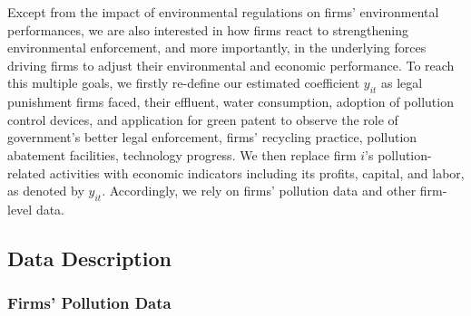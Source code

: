 \documentclass[12pt,english]{article}
\begin{document}
Except from the impact of environmental regulations on firms' environmental performances, we are also interested in how firms react to strengthening environmental enforcement, and more importantly, in the underlying forces driving firms to adjust their environmental and economic performance. To reach this multiple goals, we firstly re-define our estimated coefficient $y_{it}$ as legal punishment firms faced, their effluent, water consumption, adoption of pollution control devices, and application for green patent to observe the role of government’s better legal enforcement, firms' recycling practice, pollution abatement facilities, technology progress. We then replace firm $i$'s pollution-related activities with economic indicators including its profits, capital, and labor, as denoted by $y_{it}$.
Accordingly, we rely on firms' pollution data and other firm-level data.

\subsection{Data Description}\label{sec:data}

\subsubsection{Firms' Pollution Data}
\end{document}
